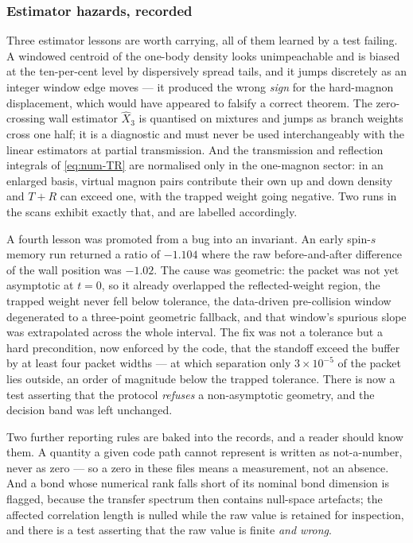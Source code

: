 \subsubsection*{Estimator hazards, recorded}

Three estimator lessons are worth carrying, all of them learned by a test
failing. A windowed centroid of the one-body density looks unimpeachable and
is biased at the ten-per-cent level by dispersively spread tails, and it
jumps discretely as an integer window edge moves --- it produced the wrong
\emph{sign} for the hard-magnon displacement, which would have appeared to
falsify a correct theorem. The zero-crossing wall estimator $\hat X_3$ is
quantised on mixtures and jumps as branch weights cross one half; it is a
diagnostic and must never be used interchangeably with the linear estimators
at partial transmission. And the transmission and reflection integrals of
\cref{eq:num-TR} are normalised only in the one-magnon sector: in an enlarged
basis, virtual magnon pairs contribute their own up and down density and
$T+R$ can exceed one, with the trapped weight going negative. Two runs in the
scans exhibit exactly that, and are labelled accordingly.

A fourth lesson was promoted from a bug into an invariant. An early spin-$s$
memory run returned a ratio of $-1.104$ where the raw before-and-after
difference of the wall position was $-1.02$. The cause was geometric: the
packet was not yet asymptotic at $t=0$, so it already overlapped the
reflected-weight region, the trapped weight never fell below tolerance, the
data-driven pre-collision window degenerated to a three-point geometric
fallback, and that window's spurious slope was extrapolated across the whole
interval. The fix was not a tolerance but a hard precondition, now enforced by
the code, that the standoff exceed the buffer by at least four packet widths
--- at which separation only $3\times10^{-5}$ of the packet lies outside, an
order of magnitude below the trapped tolerance. There is now a test asserting
that the protocol \emph{refuses} a non-asymptotic geometry, and the decision
band was left unchanged.

Two further reporting rules are baked into the records, and a reader should
know them. A quantity a given code path cannot represent is written as
not-a-number, never as zero --- so a zero in these files means a measurement,
not an absence. And a bond whose numerical rank falls short of its nominal
bond dimension is flagged, because the transfer spectrum then contains
null-space artefacts; the affected correlation length is nulled while the raw
value is retained for inspection, and there is a test asserting that the raw
value is finite \emph{and wrong}.

